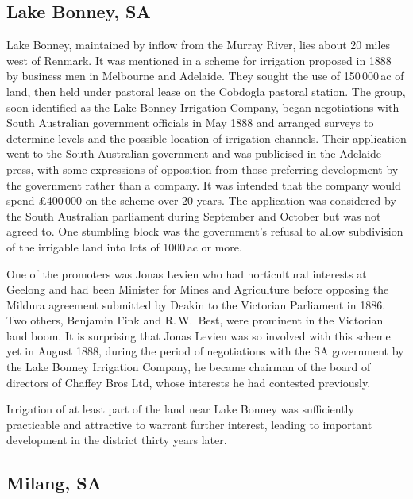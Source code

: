 \subsection*{Lake Bonney, SA} 

Lake Bonney, maintained by inflow from the Murray River, lies about 20
miles west of Renmark.  It was mentioned in a scheme for irrigation
proposed in 1888 by business men in Melbourne and Adelaide.  They
sought the use of 150\,000\,ac of land, then held under pastoral lease
on the Cobdogla pastoral station.  The group,
soon identified as the Lake Bonney Irrigation Company,  began negotiations with South Australian
government officials in May 1888 and arranged surveys to determine
levels and the possible location of irrigation channels. Their
application went to the South Australian government and was publicised
in the Adelaide press, with some expressions of opposition from those
preferring development by the government rather than a company.  It
was intended that the company would spend
\pounds400\,000 on the scheme over 20 years.  The application was
considered by the South Australian parliament during September and
October but was not agreed to.  One stumbling block was the
government's refusal to allow subdivision of the irrigable land into
lots of 1000\,ac or more.

One of the promoters was Jonas Levien  who had
horticultural interests at Geelong and had been Minister for Mines and
Agriculture before opposing the Mildura agreement submitted by Deakin
to the Victorian Parliament in 1886.  Two others, Benjamin Fink
 and
R.\,W.~Best,  were prominent in the Victorian land
boom.  It is surprising that Jonas Levien was so involved with this
scheme yet in August 1888, during the period of negotiations with the
SA government by the Lake Bonney Irrigation Company, he became
chairman of the board of directors of Chaffey Bros Ltd,  whose interests he had contested
previously.

Irrigation of at least part of the land near Lake Bonney was
sufficiently practicable and attractive to warrant further interest,
leading to important development in the district thirty years later.

\subsection*{Milang, SA}

